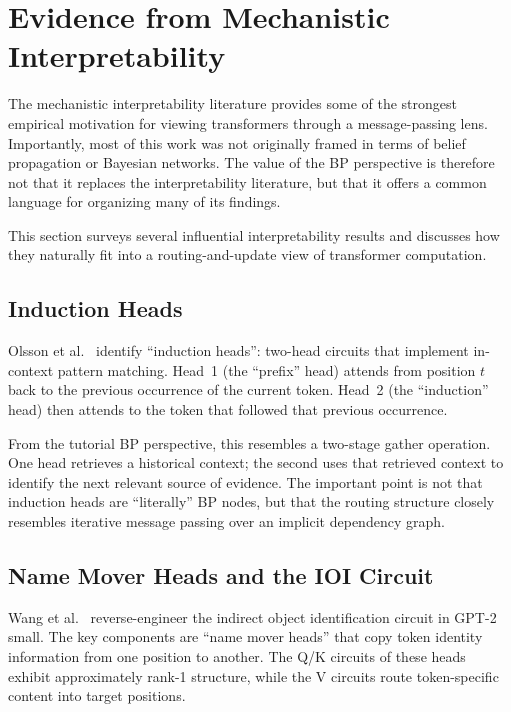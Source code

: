 \section{Evidence from Mechanistic Interpretability}
\label{sec:interp-evidence}

The mechanistic interpretability literature provides some of the
strongest empirical motivation for viewing transformers through a
message-passing lens. Importantly, most of this work was not originally
framed in terms of belief propagation or Bayesian networks. The value of
the BP perspective is therefore not that it replaces the
interpretability literature, but that it offers a common language for
organizing many of its findings.

This section surveys several influential interpretability results and
discusses how they naturally fit into a routing-and-update view of
transformer computation.

\subsection*{Induction Heads}

Olsson et al.~\cite{olsson2022induction} identify ``induction heads'':
two-head circuits that implement in-context pattern matching. Head~1
(the ``prefix'' head) attends from position $t$ back to the previous
occurrence of the current token. Head~2 (the ``induction'' head) then
attends to the token that followed that previous occurrence.

From the tutorial BP perspective, this resembles a two-stage gather
operation. One head retrieves a historical context; the second uses that
retrieved context to identify the next relevant source of evidence. The
important point is not that induction heads are ``literally'' BP nodes,
but that the routing structure closely resembles iterative message
passing over an implicit dependency graph.

\subsection*{Name Mover Heads and the IOI Circuit}

Wang et al.~\cite{wang2022ioi} reverse-engineer the indirect object
identification circuit in GPT-2 small. The key components are ``name
mover heads'' that copy token identity information from one position to
another. The Q/K circuits of these heads exhibit approximately rank-1
structure, while the V circuits route token-specific content into target
positions.

